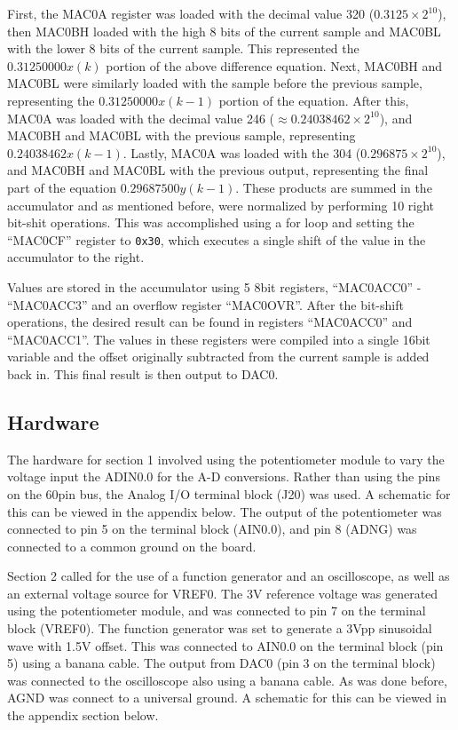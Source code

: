 \documentclass[12pt]{article}
\begin{document}
First, the MAC0A register was loaded with the decimal value 320 ($0.3125\times 2^{10}$), then MAC0BH loaded with the high 8 bits of the current sample and MAC0BL with the lower 8 bits of the current sample. This represented the $0.31250000x(k)$ portion of the above difference equation. Next, MAC0BH and MAC0BL were similarly loaded with the sample before the previous sample, representing the $0.31250000x(k-1)$ portion of the equation. After this, MAC0A was loaded with the decimal value 246 ($\approx 0.24038462\times 2^{10}$), and MAC0BH and MAC0BL with the previous sample, representing $0.24038462x(k-1)$. Lastly, MAC0A was loaded with the 304 ($0.296875\times 2^{10}$), and MAC0BH and MAC0BL with the previous output, representing the final part of the equation $0.29687500y(k-1)$. These products are summed in the accumulator and as mentioned before, were normalized by performing 10 right bit-shit operations. This was accomplished using a for loop and setting the ``MAC0CF'' register to \texttt{0x30}, which executes a single shift of the value in the accumulator to the right.

Values are stored in the accumulator using 5 8bit registers, ``MAC0ACC0'' - ``MAC0ACC3'' and an overflow register ``MAC0OVR''. After the bit-shift operations, the desired result can be found in registers ``MAC0ACC0'' and ``MAC0ACC1''. The values in these registers were compiled into a single 16bit variable and the offset originally subtracted from the current sample is added back in. This final result is then output to DAC0.
\subsection{Hardware}

The hardware for section 1 involved using the potentiometer module to vary the voltage input the ADIN0.0 for the A-D conversions. Rather than using the pins on the 60pin bus, the Analog I/O terminal block (J20) was used. A schematic for this can be viewed in the appendix below. The output of the potentiometer was connected to pin 5 on the terminal block (AIN0.0), and pin 8 (ADNG) was connected to a common ground on the board. 

Section 2 called for the use of a function generator and an oscilloscope, as well as an external voltage source for VREF0. The \si{3}{V} reference voltage was generated using the potentiometer module, and was connected to pin 7 on the terminal block (VREF0). The function generator was set to generate a \si{3}{Vpp} sinusoidal wave with \num{1.5}\si{V} offset. This was connected to AIN0.0 on the terminal block (pin 5) using a banana cable. The output from DAC0 (pin 3 on the terminal block) was connected to the oscilloscope also using a banana cable. As was done before, AGND was connect to a universal ground. A schematic for this can be viewed in the appendix section below. 
\end{document}
